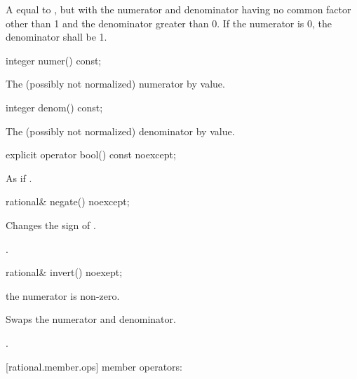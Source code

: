 \begin{addedblock}
\begin{itemdescr}
\returns A  equal to , but with the numerator and denominator having no common factor other than 1 and the denominator greater than 0. If the numerator is 0, the denominator shall be 1.
\end{itemdescr}

\begin{itemdecl}
integer numer() const;
\end{itemdecl}

\begin{itemdescr}
\returns The (possibly not normalized) numerator by value.
\end{itemdescr}

\begin{itemdecl}
integer denom() const;
\end{itemdecl}

\begin{itemdescr}
\returns The (possibly not normalized) denominator by value.
\end{itemdescr}

\begin{itemdecl}
explicit operator bool() const noexcept;
\end{itemdecl}

\begin{itemdescr}
\returns As if .
\end{itemdescr}

\begin{itemdecl}
rational& negate() noexcept;
\end{itemdecl}

\begin{itemdescr}
\effects Changes the sign of .

\returns {}.
\end{itemdescr}

\begin{itemdecl}
rational& invert() noexept;
\end{itemdecl}

\begin{itemdescr}
\requires the numerator is non-zero.
    
\effects Swaps the numerator and denominator.

\returns {}.
\end{itemdescr}

[rational.member.ops]{ member operators:}


\end{addedblock}
